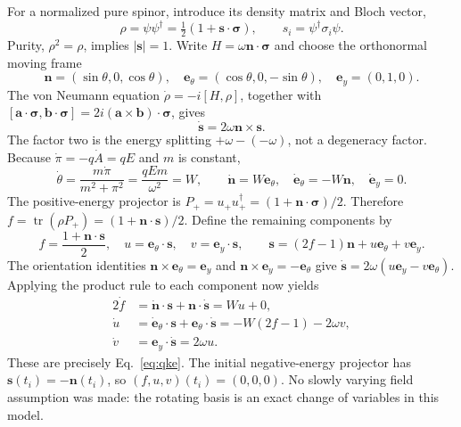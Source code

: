 \documentclass[11pt,a4paper]{article}
\begin{document}
For a normalized pure spinor, introduce its density matrix and Bloch vector,
\begin{equation}
 \rho=\psi\psi^\dagger=\tfrac12(1+\bm{s}\cdot\bm{\sigma}),\qquad
 s_i=\psi^\dagger\sigma_i\psi.
 \label{eq:blochdensity}
\end{equation}
Purity, $\rho^2=\rho$, implies $|\bm{s}|=1$. Write $H=\omega\bm{n}\cdot\bm{\sigma}$ and choose the orthonormal moving frame
\begin{equation}
 \bm{n}=(\sin\theta,0,\cos\theta),\quad
 \bm{e}_{\theta}=(\cos\theta,0,-\sin\theta),\quad
 \bm{e}_y=(0,1,0).
\end{equation}
The von Neumann equation $\dot\rho=-i[H,\rho]$, together with
$[\bm{a}\cdot\bm{\sigma},\bm{b}\cdot\bm{\sigma}]=2i(\bm{a}\times\bm{b})\cdot\bm{\sigma}$, gives
\begin{equation}
 \dot{\bm{s}}=2\omega\bm{n}\times\bm{s}.
 \label{eq:blochprecession}
\end{equation}
The factor two is the energy splitting $+\omega-(-\omega)$, not a degeneracy factor. Because $\dot\pi=-q\dot A=qE$ and $m$ is constant,
\begin{equation}
 \dot\theta=\frac{m\dot\pi}{m^2+\pi^2}
 =\frac{qEm}{\omega^2}=W,\qquad
 \dot{\bm{n}}=W\bm{e}_{\theta},\quad
 \dot{\bm{e}}_{\theta}=-W\bm{n},\quad \dot{\bm{e}}_y=0.
 \label{eq:movingframe}
\end{equation}
The positive-energy projector is $P_+=u_+u_+^\dagger=(1+\bm{n}\cdot\bm{\sigma})/2$. Therefore $f=\operatorname{tr}(\rho P_+)=(1+\bm{n}\cdot\bm{s})/2$. Define the remaining components by
\begin{equation}
 f=\frac{1+\bm{n}\cdot\bm{s}}2,\quad
 u=\bm{e}_{\theta}\cdot\bm{s},\quad v=\bm{e}_y\cdot\bm{s},\qquad
 \bm{s}=(2f-1)\bm{n}+u\bm{e}_{\theta}+v\bm{e}_y.
 \label{eq:mapping}
\end{equation}
The orientation identities $\bm{n}\times\bm{e}_{\theta}=\bm{e}_y$ and $\bm{n}\times\bm{e}_y=-\bm{e}_{\theta}$ give $\dot{\bm{s}}=2\omega(u\bm{e}_y-v\bm{e}_{\theta})$. Applying the product rule to each component now yields
\begin{align}
 2\dot f&=\dot{\bm{n}}\cdot\bm{s}+\bm{n}\cdot\dot{\bm{s}}=Wu+0,\nonumber\\
 \dot u&=\dot{\bm{e}}_{\theta}\cdot\bm{s}+\bm{e}_{\theta}\cdot\dot{\bm{s}}
       =-W(2f-1)-2\omega v,\label{eq:qkederived}\\
 \dot v&=\bm{e}_y\cdot\dot{\bm{s}}=2\omega u.\nonumber
\end{align}
These are precisely Eq.~\eqref{eq:qke}. The initial negative-energy projector has $\bm{s}(t_i)=-\bm{n}(t_i)$, so $(f,u,v)(t_i)=(0,0,0)$. No slowly varying field assumption was made: the rotating basis is an exact change of variables in this model.
\end{document}
